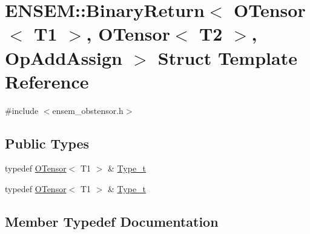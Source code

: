 \hypertarget{structENSEM_1_1BinaryReturn_3_01OTensor_3_01T1_01_4_00_01OTensor_3_01T2_01_4_00_01OpAddAssign_01_4}{}\section{E\+N\+S\+EM\+:\+:Binary\+Return$<$ O\+Tensor$<$ T1 $>$, O\+Tensor$<$ T2 $>$, Op\+Add\+Assign $>$ Struct Template Reference}
\label{structENSEM_1_1BinaryReturn_3_01OTensor_3_01T1_01_4_00_01OTensor_3_01T2_01_4_00_01OpAddAssign_01_4}


{\ttfamily \#include $<$ensem\+\_\+obstensor.\+h$>$}

\subsection*{Public Types}
\begin{DoxyCompactItemize}
\item 
typedef \mbox{\hyperlink{classENSEM_1_1OTensor}{O\+Tensor}}$<$ T1 $>$ \& \mbox{\hyperlink{structENSEM_1_1BinaryReturn_3_01OTensor_3_01T1_01_4_00_01OTensor_3_01T2_01_4_00_01OpAddAssign_01_4_aed2beb3db4a1e722845946dc12345ba1}{Type\+\_\+t}}
\item 
typedef \mbox{\hyperlink{classENSEM_1_1OTensor}{O\+Tensor}}$<$ T1 $>$ \& \mbox{\hyperlink{structENSEM_1_1BinaryReturn_3_01OTensor_3_01T1_01_4_00_01OTensor_3_01T2_01_4_00_01OpAddAssign_01_4_aed2beb3db4a1e722845946dc12345ba1}{Type\+\_\+t}}
\end{DoxyCompactItemize}


\subsection{Member Typedef Documentation}
\mbox{\label{structENSEM_1_1BinaryReturn_3_01OTensor_3_01T1_01_4_00_01OTensor_3_01T2_01_4_00_01OpAddAssign_01_4_aed2beb3db4a1e722845946dc12345ba1}} 
